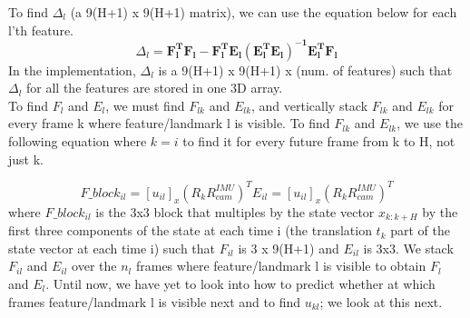 To find $\Delta_l$ (a 9(H+1) x 9(H+1) matrix), we can use the equation below for each l'th feature. 
\begin{equation}
    \Delta_l = \mathbf{F_l^TF_l - F_l^TE_l(E_l^TE_l)^{-1}E_l^TF_l}
\end{equation}
In the implementation, $\Delta_l$ is a 9(H+1) x 9(H+1) x (num. of features) such that $\Delta_l$ for all the features are stored in one 3D array.\\

To find $F_l$ and $E_l$, we must find $F_{lk}$ and $E_{lk}$, and vertically stack $F_{lk}$ and $E_{lk}$ for every frame k where feature/landmark l is visible. To find 
$F_{lk}$ and $E_{lk}$, we use the following equation where $k = i$ to find it for every future frame from k to H, not just k. 

\begin{equation}
    F\_block_{il} = [u_{il}]_x(R_kR_{cam}^{IMU})^T
    E_{il} = [u_{il}]_x(R_kR_{cam}^{IMU})^T
\end{equation}
where $F\_block_{il}$ is the 3x3 block that multiples by the state vector $x_{k:k+H}$ by the first three components of the state at each time i (the translation $t_k$ part of the state vector at each time i) such that $F_{il}$ is 3 x 9(H+1)  and $E_{il}$ is 3x3. We stack $F_{il}$ and $E_{il}$ over the $n_l$ frames where feature/landmark l is visible to obtain $F_l$ and $E_l$. Until now, we have yet to look into how to predict whether at which frames feature/landmark l is visible next and to find $u_{kl}$; we look at this next. 
